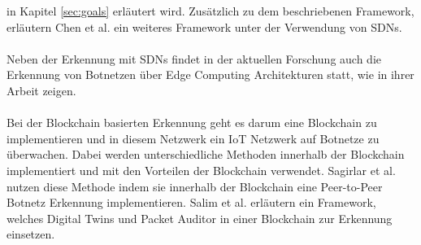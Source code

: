 in Kapitel \ref{sec:goals} erläutert wird. Zusätzlich zu dem beschriebenen Framework, erläutern Chen et al. \cite{Chen2017BotGuardLR} ein weiteres Framework unter der Verwendung von 
SDNs. \\ \\ Neben der Erkennung mit SDNs findet in der aktuellen Forschung auch die Erkennung von Botnetzen über Edge Computing Architekturen statt, wie \cite{gromov2022edge} in ihrer
Arbeit zeigen. \\ \\ Bei der Blockchain basierten Erkennung geht es darum eine Blockchain zu implementieren und in diesem Netzwerk ein IoT Netzwerk auf Botnetze zu überwachen. Dabei 
werden unterschiedliche Methoden innerhalb der Blockchain implementiert und mit den Vorteilen der Blockchain verwendet. Sagirlar et al. \cite{DBLP:journals/corr/abs-1809-10775} nutzen
diese Methode indem sie innerhalb der Blockchain eine Peer-to-Peer Botnetz Erkennung implementieren. Salim et al. \cite{DBLP:journals/sensors/SalimATPP22} erläutern ein Framework, welches 
Digital Twins und Packet Auditor in einer Blockchain zur Erkennung einsetzen. 

